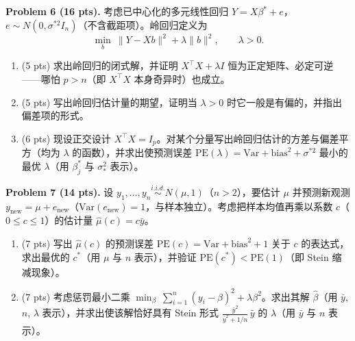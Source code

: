 \documentclass[11pt]{ctexart}
\begin{document}
\noindent\textbf{Problem 6 (16 pts).} 考虑已中心化的多元线性回归 $Y = X\beta^* + e$，$e \sim N(0, \sigma^{*2}I_n)$（不含截距项）。岭回归定义为
\[
\min_b\ \|Y - Xb\|^2 + \lambda\|b\|^2, \qquad \lambda > 0.
\]
\begin{enumerate}
\item (5 pts) 求出岭回归的闭式解，并证明 $X^{\top}X + \lambda I$ 恒为正定矩阵、必定可逆——哪怕 $p > n$（即 $X^{\top}X$ 本身奇异时）也成立。
\item (5 pts) 写出岭回归估计量的期望，证明当 $\lambda > 0$ 时它一般是有偏的，并指出偏差项的形式。
\item (6 pts) 现设正交设计 $X^{\top}X = I_p$。对某个分量写出岭回归估计的方差与偏差平方（均为 $\lambda$ 的函数），并求出使预测误差 $\mathrm{PE}(\lambda) = \mathrm{Var} + \mathrm{bias}^2 + \sigma^{*2}$ 最小的最优 $\lambda$（用 $\beta_j^*$ 与 $\sigma_*^2$ 表示）。
\end{enumerate}

\noindent\textbf{Problem 7 (14 pts).} 设 $y_1, \ldots, y_n \overset{i.i.d.}{\sim} N(\mu, 1)$（$n > 2$），要估计 $\mu$ 并预测新观测 $y_{\mathrm{new}} = \mu + e_{\mathrm{new}}$（$\mathrm{Var}(e_{\mathrm{new}}) = 1$，与样本独立）。考虑把样本均值再乘以系数 $c$（$0 \le c \le 1$）的估计量 $\hat\mu(c) = c\bar{y}$。
\begin{enumerate}
\item (7 pts) 写出 $\hat\mu(c)$ 的预测误差 $\mathrm{PE}(c) = \mathrm{Var} + \mathrm{bias}^2 + 1$ 关于 $c$ 的表达式，求出最优的 $c^*$（用 $\mu$ 与 $n$ 表示），并验证 $\mathrm{PE}(c^*) < \mathrm{PE}(1)$（即 Stein 缩减现象）。
\item (7 pts) 考虑惩罚最小二乘 $\min_\beta\ \sum_{i=1}^n (y_i - \beta)^2 + \lambda\beta^2$。求出其解 $\hat\beta$（用 $\bar{y}$, $n$, $\lambda$ 表示），并求出使该解恰好具有 Stein 形式 $\frac{\bar{y}^2}{\bar{y}^2 + 1/n}\,\bar{y}$ 的 $\lambda$（用 $\bar{y}$ 与 $n$ 表示）。
\end{enumerate}
\end{document}
